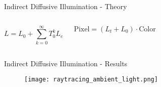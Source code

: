 \begin{frame}{Indirect Diffusive Illumination - Theory}
\begin{columns}[T]
            \vspace{0.2cm}

            \begin{equation*}
                L = L_0 + \sum^\infty_{k=0}T_0^k L_e
            \end{equation*}

            \vspace{0.2cm}

            \pause
            \begin{equation*}
                \text{Pixel} = (L_t + L_0) \cdot \text{Color}
            \end{equation*}
        \end{columns}
    \end{frame}

    \begin{frame}{Indirect Diffusive Illumination - Results}
        \begin{figure}
            \centering
            \texttt{[image: raytracing\_ambient\_light.png]}
        \end{figure}  
    \end{frame}



